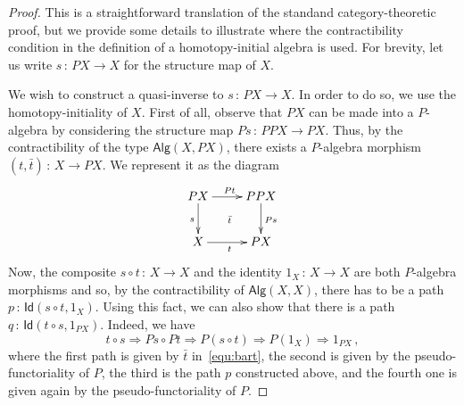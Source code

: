 \documentclass[10pt,a4paper,oneside,reqno]{amsart}
\newcommand{\xycenter}[1]{\vcenter{\hbox{\xymatrix{#1}}}}
\theoremstyle{mythm}
\theoremstyle{mydef}
\theoremstyle{myrmk}
\newcommand{\co}{\,{:}\,}
\newcommand{\Id}{\mathsf{Id}}
\newcommand{\Palg}{\mathsf{Alg}}
\begin{document}
\begin{proof} This is a straightforward translation of the standand category-theoretic proof, but we provide
some details to illustrate where the contractibility condition in the definition of a homotopy-initial algebra is
used. For brevity, let us write $s \co PX \to X$ for the structure map of $X$. 

 We wish to construct a quasi-inverse to $s \co PX \to X$. In order to do so, we use the homotopy-initiality
of $X$. First of all, observe that $PX$ can be made into a $P$-algebra by considering the structure map 
$Ps \co PPX \to PX$. Thus, by the contractibility of the type $\Palg(X, PX)$, there exists a $P$-algebra
morphism $(t, \bar{t}) \co X \to PX$. We represent it as the diagram
\begin{equation}
\label{equ:bart}
\xycenter{
PX \ar[d]_{s} \ar[r]^{Pt} \ar@{}[dr]|{\bar{t}}& PPX \ar[d]^{Ps} \\
X \ar[r]_{t} & PX}
\end{equation}
Now, the composite $s \circ t \co X \to X$ and the identity $1_X \co X \to X$ are both $P$-algebra
morphisms and so, by the contractibility of $\Palg(X,X)$, there has to be a path $p \co \Id(s\circ t ,1_X)$. 
Using this fact, we can also show that there is a path $q \co \Id(t \circ s, 1_{PX})$. Indeed, we have
\[
t \circ s  \Rightarrow Ps \circ Pt 
 \Rightarrow P(s \circ t) 
 \Rightarrow P(1_X) 
  \Rightarrow 1_{PX} \, ,
\]
where the first path is given by $\bar{t}$ in~\eqref{equ:bart}, the second is given by the pseudo-functoriality of $P$,
the third is the path $p$ constructed above, and the fourth one is given again by the pseudo-functoriality of $P$. 
\end{proof}
\end{document}
